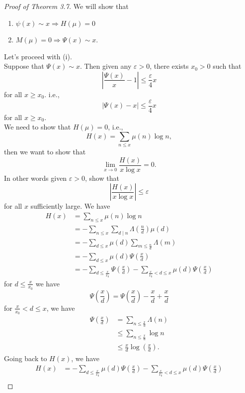 \documentclass[twoside, openright, fontsize=10pt, headings=big]{scrbook}
\begin{document}
\begin{proof}[Proof of Theorem 3.7]
    We will show that
    \begin{enumerate}[label=(\roman*)]
        \item $\psi(x)\sim x\Rightarrow H(\mu)=0$
        \item $M(\mu)=0\Rightarrow \Psi(x)\sim x.$
    \end{enumerate}
    Let's proceed with (i).\\
    Suppose that $\Psi(x)\sim x$. Then given any $\varepsilon>0$, there exists $x_0>0$ such that
    \[
        \left|\frac{\Psi(x)}{x}-1\right|\leq\frac{\varepsilon}{4}x
    \]
    for all $x\geq x_0$. i.e., 
    \[
        |\Psi(x)-x|\leq\frac{\varepsilon}{4}x
    \]
    for all $x\geq x_0$.\\
    We need to show that $H(\mu)=0$, i.e.,
    \[
        H(x)=\sum_{n\leq x}\mu(n)\log n,
    \]
    then we want to show that
    \[
        \lim_{x\to 0}\frac{H(x)}{x\log x}=0.
    \]
    In other words given $\varepsilon>0$, show that 
    \[
        \left|\frac{H(x)}{x\log x}\right|\leq\varepsilon
    \]
    for all $x$ sufficiently large. We have 
    \begin{align*}
        H(x)&=\sum_{n\leq x}\mu(n)\log n\\
        &=-\sum_{n\leq x}\sum_{d\mid n}\Lambda\left(\frac{n}{d}\right)\mu(d)\\
        &=-\sum_{d\leq x}\mu(d)\sum_{m\leq\frac{n}{d}}\Lambda(m)\\
        &=-\sum_{d\leq x}\mu(d)\Psi\left(\frac{x}{d}\right)\\
        &=-\sum_{d\leq\frac{x}{x_0}}\Psi\left(\frac{x}{d}\right)-\sum_{\frac{x}{x_0}<d\leq x}\mu(d)\Psi\left(\frac{x}{d}\right)
    \end{align*}
    for $d\leq\frac{x}{x_0}$ we have 
    \[
        \Psi\left(\frac{x}{d}\right)=\Psi\left(\frac{x}{d}\right)-\frac{x}{d}+\frac{x}{d}
    \]
    for $\frac{x}{x_0}<d\leq x$, we have 
    \begin{align*}
        \Psi\left(\frac{x}{d}\right)&=\sum_{n\leq\frac{x}{d}}\Lambda(n)\\
        &\leq\sum_{n\leq\frac{x}{d}}\log n\\
        &\leq\frac{x}{d}\log\left(\frac{x}{d}\right).
    \end{align*}
    Going back to $H(x)$, we have
    \begin{align*}
        H(x)&=-\sum_{d\leq\frac{x}{x_0}}\mu(d)\Psi\left(\frac{x}{d}\right)-\sum_{\frac{x}{x_0}<d\leq x}\mu(d)\Psi\left(\frac{x}{d}\right)\\

\end{align*}
\end{proof}
\end{document}
